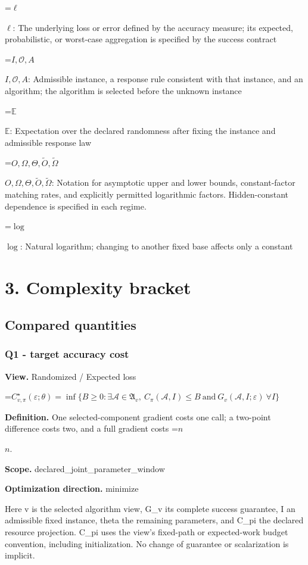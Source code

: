 \documentclass[10pt,a4paper]{article}
\newcommand{\AtlasMath}[1]{\par\begingroup\centering\setbox0=\hbox{$\displaystyle #1$}\ifdim\wd0>1.4\linewidth\typeout{ATLAS WIDE FORMULA: \the\wd0}\fi\ifdim\wd0>\linewidth\resizebox{\linewidth}{!}{\box0}\else\box0\fi\par\endgroup}
\newcommand{\AtlasInlineMath}[1]{\begingroup\setbox0=\hbox{$#1$}\ifdim\wd0>.4\linewidth\endgroup\AtlasMath{#1}\else\endgroup$#1$\fi}
\begin{document}
\AtlasInlineMath{\ell}: The underlying loss or error defined by the accuracy measure; its expected, probabilistic, or worst-case aggregation is specified by the success contract

\AtlasInlineMath{I,\mathcal{O},A}: Admissible instance, a response rule consistent with that instance, and an algorithm; the algorithm is selected before the unknown instance

\AtlasInlineMath{\mathbb{E}}: Expectation over the declared randomness after fixing the instance and admissible response law

\AtlasInlineMath{O,\Omega,\Theta,\widetilde{O},\widetilde\Omega}: Notation for asymptotic upper and lower bounds, constant-factor matching rates, and explicitly permitted logarithmic factors. Hidden-constant dependence is specified in each regime.

\AtlasInlineMath{\log}: Natural logarithm; changing to another fixed base affects only a constant

\section{3. Complexity bracket}
\subsection{Compared quantities}
\subsubsection{Q1 - target accuracy cost}
\textbf{View.} Randomized / Expected loss

\AtlasMath{C^\star_{v,\pi}(\varepsilon;\theta)=\inf\{B\ge0:\exists\mathcal A\in\mathfrak A_v,\ C_\pi(\mathcal A,I)\le B\ \text{and}\ G_v(\mathcal A,I;\varepsilon)\ \forall I\}}
\textbf{Definition.} One selected-component gradient costs one call; a two-point difference costs two, and a full gradient costs \AtlasInlineMath{n}.

\textbf{Scope.} declared\_joint\_parameter\_window

\textbf{Optimization direction.} minimize

Here v is the selected algorithm view, G\_v its complete success guarantee, I an admissible fixed instance, theta the remaining parameters, and C\_pi the declared resource projection. C\_pi uses the view's fixed-path or expected-work budget convention, including initialization. No change of guarantee or scalarization is implicit.
\end{document}
